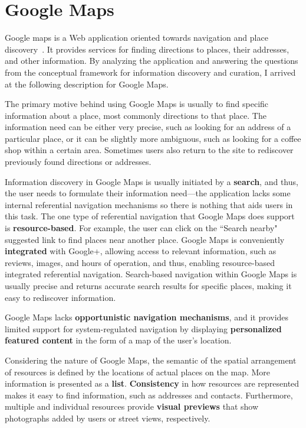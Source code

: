 {\section{Google Maps}
Google maps is a Web application oriented towards navigation and place discovery~\cite{gibson2006google}. It provides services for finding directions to places, their addresses, and other information. By analyzing the application and answering the questions from the conceptual framework for information discovery and curation, I arrived at the following description for Google Maps.

The primary motive behind using Google Maps is usually to find specific information about a place, most commonly directions to that place. The information need can be either very precise, such as looking for an address of a particular place, or it can be slightly more ambiguous, such as looking for a coffee shop within a certain area. Sometimes users also return to the site to rediscover previously found directions or addresses.

Information discovery in Google Maps is usually initiated by a \textbf{search}, and thus, the user needs to formulate their information need---the application lacks some internal referential navigation mechanisms so there is nothing that aids users in this task. The one type of referential navigation that Google Maps does support is \textbf{resource-based}. For example, the user can click on the ``Search nearby" suggested link to find places near another place. Google Maps is conveniently \textbf{integrated} with Google+, allowing access to relevant information, such as reviews, images, and hours of operation, and thus, enabling resource-based integrated referential navigation. Search-based navigation within Google Maps is usually precise and returns accurate search results for specific places, making it easy to rediscover information. 

Google Maps lacks \textbf{opportunistic navigation mechanisms}, and it provides limited support for system-regulated navigation by displaying \textbf{personalized featured content} in the form of a map of the user's location.  

Considering the nature of Google Maps, the semantic of the spatial arrangement of resources is defined by the locations of actual places on the map. More information is presented as a \textbf{list}. \textbf{Consistency} in how resources are represented makes it easy to find information, such as addresses and contacts. Furthermore, multiple and individual resources provide \textbf{visual previews} that show photographs added by users or street views, respectively.

}
